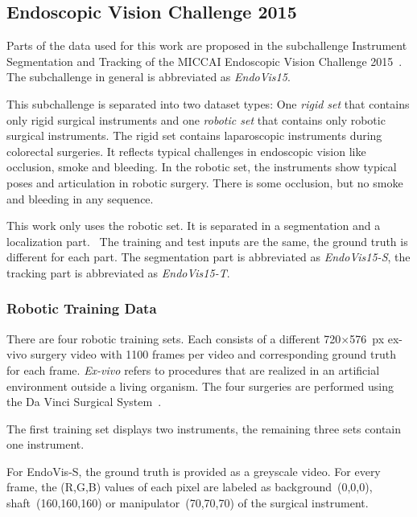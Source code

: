\subsection{Endoscopic Vision Challenge 2015}
\label{sec:endovis15}
Parts of the data used for this work are proposed in the subchallenge Instrument Segmentation and Tracking of the MICCAI Endoscopic Vision Challenge 2015~\cite{EndoVis15}. The subchallenge in general is abbreviated as \emph{EndoVis15}.

This subchallenge is separated into two dataset types: One \emph{rigid set} that contains only rigid surgical instruments and one \emph{robotic set} that contains only robotic surgical instruments.
The rigid set contains laparoscopic instruments during colorectal surgeries. It reflects typical challenges in endoscopic vision like occlusion, smoke and bleeding. 
In the robotic set, the instruments show typical poses and articulation in robotic surgery.  There is some occlusion, but no smoke and bleeding in any sequence.

This work only uses the robotic set. It is separated in a segmentation and a localization part.~\cite{EndoVis15}
The training and test inputs are the same, the ground truth is different for each part.
The segmentation part is abbreviated as \emph{EndoVis15-S}, the tracking part is abbreviated as \emph{EndoVis15-T}. 

\subsubsection{Robotic Training Data}
\label{sec:endovis15_robotic_train}
There are four robotic training sets. Each consists of a different 720$\times$576~px ex-vivo surgery video with 1100 frames per video and corresponding ground truth for each frame.
\emph{Ex-vivo} refers to procedures that are realized in an artificial environment outside a living organism.
The four surgeries are performed using the Da Vinci Surgical System~\cite{davinci2014watanabe}.

The first training set displays two instruments, the remaining three sets contain one instrument.

For EndoVis-S, the ground truth is provided as a greyscale video. For every frame, the (R,G,B) values of each pixel are labeled as background~(0,0,0), shaft~(160,160,160) or manipulator~(70,70,70) of the surgical instrument.

